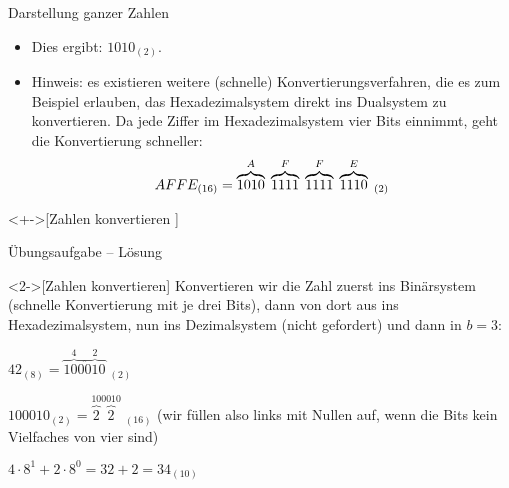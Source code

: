 \begin{frame}[fragile]{Darstellung ganzer Zahlen}
\begin{itemize}[<+(1)->]
    \item Dies ergibt: \(1010_{(2)}\).
    \item Hinweis: es existieren weitere (schnelle) Konvertierungsverfahren,\pause{} die es zum Beispiel erlauben, das Hexadezimalsystem direkt ins Dualsystem zu konvertieren.\pause{} Da jede Ziffer im Hexadezimalsystem vier Bits einnimmt, geht die Konvertierung schneller:\pause{} \[
        AFFE_{(16)} = \overbrace{1010}^{A}\;\overbrace{1111}^{F}\;\overbrace{1111}^{F}\;\overbrace{1110}^{E}\;{}_{(2)}\vspace*{-0.4cm}
    \]
\end{itemize}
\ifull{}%
\begin{exercise}<+->[Zahlen konvertieren ]
\end{exercise}\fi
\end{frame}

\ifull
\begin{frame}[c]{Übungsaufgabe -- Lösung}
\begin{solve}<2->[Zahlen konvertieren]
    \pause{}Konvertieren wir die Zahl zuerst ins Binärsystem (schnelle Konvertierung mit je drei Bits),\pause{} dann von dort aus ins Hexadezimalsystem,\pause{} nun ins Dezimalsystem (nicht gefordert) und dann in \(b = 3\):\pause{} \begin{description}[b = 16]
        \item[b = 2] \(42_{(8)} = \overbrace{100}^{4}\overbrace{010}^{2}\;{}_{(2)}\)
        \item[b = 16] \(100010_{(2)} = \overbrace{2}^{10}\overbrace{2}^{0010}\;{}_{(16)}\) (wir füllen also links mit Nullen auf, wenn die Bits kein Vielfaches von vier sind)
        \item[b = 10] \(4 \cdot 8^1 + 2 \cdot 8^0 = 32 + 2 = 34_{(10)}\)
    \end{description}
\end{solve}
\end{frame}

